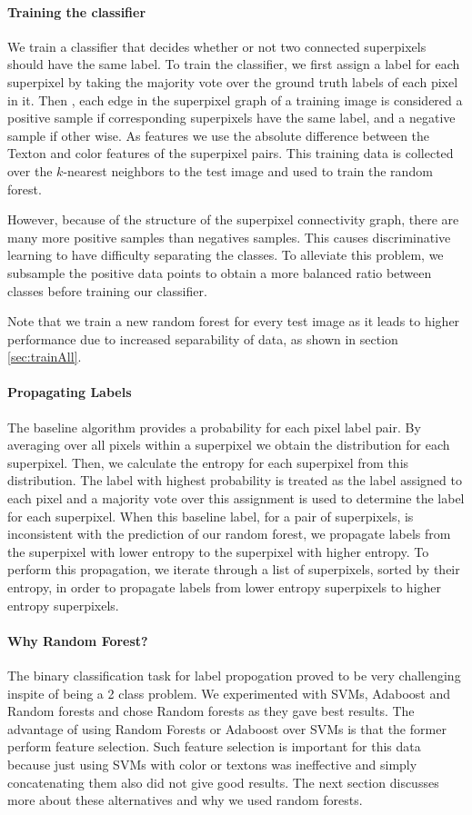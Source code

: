 \documentclass{article} %
\begin{document}
\paragraph{Training the classifier}
We train a classifier that decides whether or not two connected superpixels should
have the same label.
To train the classifier, we first assign a label for each superpixel by taking the majority vote over the ground truth labels of each pixel in it.
Then , each edge in the superpixel graph of a training image is considered a
positive sample if corresponding superpixels have the same label, and a negative sample if other wise.
As features we use the absolute difference between the Texton and color features of the superpixel pairs.
This training data is collected over the $k$-nearest neighbors to the test
image and used to train the random forest.

However, because of the structure of the superpixel connectivity graph, there are many more positive samples than negatives samples.
This causes discriminative learning to have difficulty separating the classes.
To alleviate this problem, we subsample the positive data points to obtain a more balanced ratio between classes before training our classifier.

Note that we train a new random forest for every test image as it leads to higher performance due to increased separability of data, as shown in section \ref{sec:trainAll}.

\paragraph{Propagating Labels}
The baseline algorithm provides a probability for each pixel label pair. By averaging over all pixels within a superpixel we obtain the distribution for each superpixel.
Then, we calculate the entropy for each superpixel from this distribution.
The label with highest probability is treated as the label assigned to
each pixel and a majority vote over this assignment is used to determine the label for
each superpixel.
When this baseline label, for a pair of superpixels, is inconsistent with the prediction of our random forest, we propagate labels from the superpixel with lower entropy to
the superpixel with higher entropy.
To perform this propagation, we iterate through a list of superpixels, sorted by their entropy, in order to propagate labels from lower entropy superpixels to higher entropy superpixels.

\paragraph{Why Random Forest?} 
The binary classification task for label propogation proved to be very challenging inspite of being a 2 class problem. We experimented with SVMs, Adaboost and Random forests and chose Random forests as they gave best results. The advantage of using Random Forests or Adaboost over SVMs is that the former perform feature selection. Such feature selection is important for this data because just using SVMs with color or textons was ineffective and simply concatenating them also did not give good results. The next section discusses more about these alternatives and why we used random forests.
\end{document}
